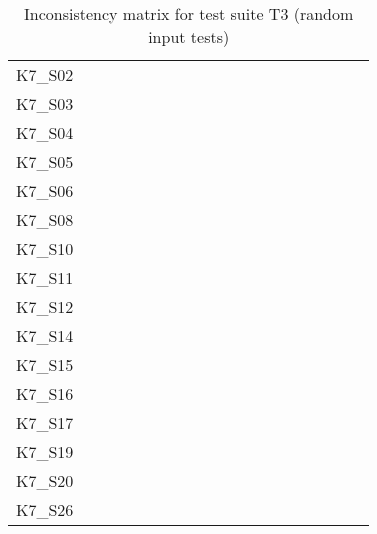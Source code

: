 \begin{table}[htpb]
\begin{tabular}{l|rrrrrrrrrrrrrrrrrr}
        K7\_S02 & \y & \x & \y & \y & \y & \y & \y & \y & \y & \y & \y & \y & \y & \y & \y & \y & \y & \y \\
        K7\_S03 & \y & \x & \x & \y & \y & \y & \y & \x & \y & \y & \y & \x & \y & \y & \y & \y & \y & \y \\
        K7\_S04 & \y & \x & \x & \y & \y & \y & \y & \y & \y & \y & \y & \y & \y & \y & \x & \x & \y & \y \\
        K7\_S05 & \y & \y & \y & \y & \y & \y & \y & \y & \y & \y & \y & \y & \y & \y & \y & \x & \y & \y \\
        K7\_S06 & \y & \y & \y & \y & \y & \y & \y & \y & \y & \y & \y & \y & \y & \y & \y & \y & \y & \y \\
        K7\_S08 & \y & \x & \x & \y & \y & \y & \y & \y & \y & \y & \y & \y & \y & \y & \y & \y & \y & \y \\
        K7\_S10 & \y & \x & \x & \y & \y & \y & \y & \y & \y & \y & \y & \x & \y & \y & \x & \y & \y & \y \\
        K7\_S11 & \y & \y & \y & \y & \y & \y & \y & \y & \y & \y & \y & \y & \y & \y & \y & \y & \y & \y \\
        K7\_S12 & \y & \y & \y & \y & \y & \y & \y & \y & \y & \y & \y & \y & \x & \x & \x & \x & \y & \y \\
        K7\_S14 & \y & \y & \x & \y & \y & \y & \y & \y & \y & \y & \y & \y & \x & \x & \y & \x & \y & \y \\
        K7\_S15 & \y & \y & \y & \y & \y & \y & \y & \x & \y & \y & \y & \x & \y & \y & \y & \y & \y & \y \\
        K7\_S16 & \y & \x & \y & \y & \y & \y & \y & \y & \y & \y & \y & \x & \y & \y & \x & \y & \y & \y \\
        K7\_S17 & \y & \y & \y & \y & \x & \y & \y & \y & \y & \y & \y & \x & \y & \y & \x & \y & \y & \y \\
        K7\_S19 & \y & \y & \y & \y & \y & \y & \y & \x & \y & \y & \y & \y & \x & \y & \y & \y & \y & \y \\
        K7\_S20 & \y & \x & \x & \y & \y & \y & \y & \y & \y & \y & \y & \y & \y & \y & \y & \y & \y & \y \\
        K7\_S26 & \y & \y & \y & \y & \y & \y & \y & \y & \y & \y & \y & \y & \y & \x & \x & \x & \x & \y \\
        \bottomrule
    \end{tabular}
    \caption{Inconsistency matrix for test suite T3 (random input tests)}
    \label{tab:inconsistencies_matrix_random}
    \setlength{\tabcolsep}{\defaulttabcolsep}
\end{table}

